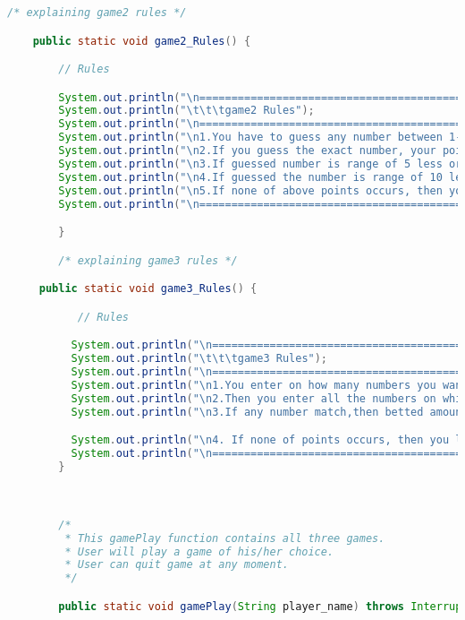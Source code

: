 \documentclass[]{article}
\begin{document}
\begin{lstlisting}[language=Java]
        /* explaining game2 rules */

    public static void game2_Rules() {

        // Rules

        System.out.println("\n======================================================================\n");
        System.out.println("\t\t\tgame2 Rules");
        System.out.println("\n========================================================================");
        System.out.println("\n1.You have to guess any number between 1-50.");
        System.out.println("\n2.If you guess the exact number, your points will be 5 times");
        System.out.println("\n3.If guessed number is range of 5 less or 5 more points will be 2 times");
        System.out.println("\n4.If guessed the number is range of 10 less or 10 more, points will same");
        System.out.println("\n5.If none of above points occurs, then you loose all betted amount");
        System.out.println("\n======================================================================\n"); 

        }

        /* explaining game3 rules */

     public static void game3_Rules() {

           // Rules

          System.out.println("\n====================================================================\n");
          System.out.println("\t\t\tgame3 Rules");
          System.out.println("\n======================================================================");
          System.out.println("\n1.You enter on how many numbers you wanna bet in range [1-50].");
          System.out.println("\n2.Then you enter all the numbers on which you wanna bet");
          System.out.println("\n3.If any number match,then betted amount number gets multiplied by 50");

          System.out.println("\n4. If none of points occurs, then you loose all your betted amount");
          System.out.println("\n====================================================================\n");
        }



        /* 
         * This gamePlay function contains all three games.
         * User will play a game of his/her choice.
         * User can quit game at any moment.
         */

        public static void gamePlay(String player_name) throws InterruptedException {


\end{lstlisting}
\end{document}
